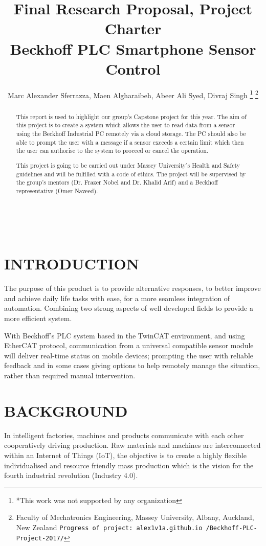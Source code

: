 \documentclass[a4paper, 10pt, conference]{IEEEconf}
\title{\LARGE \bf
Final Research Proposal, Project Charter\\Beckhoff PLC Smartphone Sensor Control
}
\author{Marc Alexander Sferrazza, Maen Algharaibeh, Abeer Ali Syed, Divraj Singh%
\thanks{*This work was not supported by any organization}%
\thanks{Faculty of Mechatronics Engineering, Massey University, Albany, Auckland, New Zealand
        {\tt\small Progress of project: alex1v1a.github.io /Beckhoff-PLC-Project-2017/}}%
}
\begin{document}
\begin{figure}
	\centering
	
\end{figure}

\

\maketitle
\thispagestyle{empty}
\pagestyle{empty}


\begin{abstract}

This report is used to highlight our group's Capstone project for this year. The aim of this project is to create a system which allows the user to read data from a sensor using the Beckhoff Industrial PC remotely via a cloud storage. The PC should also be able to prompt the user with a message if a sensor exceeds a certain limit which then the user can authorise to the system to proceed or cancel the operation.  

This project is going to be carried out under Massey University's Health and Safety guidelines and will be fulfilled with a code of ethics. The project will be supervised by the group's mentors (Dr. Frazer Nobel and Dr. Khalid Arif) and a Beckhoff representative (Omer Naveed).

\end{abstract}


\section{INTRODUCTION}
The purpose of this product is to provide alternative responses, to better improve and achieve daily life tasks with ease, for a more seamless integration of automation. Combining two strong aspects of well developed fields to provide a more efficient system.

With Beckhoff's PLC system based in the TwinCAT environment, and using EtherCAT protocol, communication from a universal compatible sensor module will deliver real-time status on mobile devices; prompting the user with reliable feedback and in some cases giving options to help remotely manage the situation, rather than required manual intervention.

\section{BACKGROUND}
In intelligent factories, machines and products communicate with each other cooperatively driving production. Raw materials and machines are interconnected within an Internet of Things (IoT), the objective is to create a highly flexible individualised and resource friendly mass production which is the vision for the fourth industrial revolution (Industry 4.0).
\end{document}
